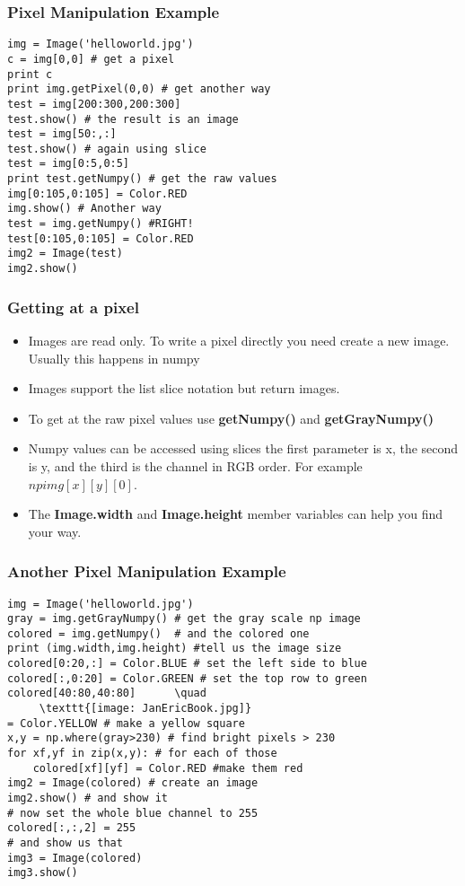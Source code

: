 \documentclass[compress]{beamer}
\begin{document}
\begin{frame}[fragile] 
\frametitle{Pixel Manipulation Example}
\begin{example}
\begin{verbatim}
img = Image('helloworld.jpg')
c = img[0,0] # get a pixel
print c
print img.getPixel(0,0) # get another way
test = img[200:300,200:300]
test.show() # the result is an image
test = img[50:,:]
test.show() # again using slice
test = img[0:5,0:5]
print test.getNumpy() # get the raw values
img[0:105,0:105] = Color.RED 
img.show() # Another way
test = img.getNumpy() #RIGHT!
test[0:105,0:105] = Color.RED
img2 = Image(test)
img2.show()
\end{verbatim}
\end{example}
\end{frame}
\begin{frame}
\frametitle{Getting at a pixel}
\begin{itemize}
\item Images are read only. To write a pixel directly you need create a new
  image. Usually this happens in numpy
\item Images support the list slice notation but return images.
\item To get at the raw pixel values use \textbf{getNumpy()} and \textbf{getGrayNumpy()} 
\item Numpy values can be accessed using slices the first parameter is
  x, the second is y,  and the third is the channel in RGB order. For
  example $npimg[x][y][0]$. 
\item The \textbf{Image.width} and \textbf{Image.height} member
  variables can help you find your way. 
\end{itemize}
\end{frame}
\begin{frame}[fragile] 
\frametitle{Another Pixel Manipulation Example}
\begin{example}
\begin{verbatim}
img = Image('helloworld.jpg')
gray = img.getGrayNumpy() # get the gray scale np image
colored = img.getNumpy()  # and the colored one
print (img.width,img.height) #tell us the image size
colored[0:20,:] = Color.BLUE # set the left side to blue
colored[:,0:20] = Color.GREEN # set the top row to green
colored[40:80,40:80]      \quad
     \texttt{[image: JanEricBook.jpg]}
= Color.YELLOW # make a yellow square
x,y = np.where(gray>230) # find bright pixels > 230
for xf,yf in zip(x,y): # for each of those
    colored[xf][yf] = Color.RED #make them red
img2 = Image(colored) # create an image
img2.show() # and show it
# now set the whole blue channel to 255
colored[:,:,2] = 255 
# and show us that
img3 = Image(colored)
img3.show()
\end{verbatim}
\end{example}
\end{frame}
\end{document}
